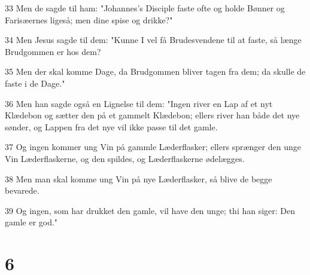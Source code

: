 \par 33 Men de sagde til ham: "Johannes's Disciple faste ofte og holde Bønner og Farisæernes ligeså; men dine spise og drikke?"
\par 34 Men Jesus sagde til dem: "Kunne I vel få Brudesvendene til at faste, så længe Brudgommen er hos dem?
\par 35 Men der skal komme Dage, da Brudgommen bliver tagen fra dem; da skulle de faste i de Dage."
\par 36 Men han sagde også en Lignelse til dem: "Ingen river en Lap af et nyt Klædebon og sætter den på et gammelt Klædebon; ellers river han både det nye sønder, og Lappen fra det nye vil ikke passe til det gamle.
\par 37 Og ingen kommer ung Vin på gammle Læderflasker; ellers sprænger den unge Vin Læderflaskerne, og den spildes, og Læderflaskerne ødelægges.
\par 38 Men man skal komme ung Vin på nye Læderflasker, så blive de begge bevarede.
\par 39 Og ingen, som har drukket den gamle, vil have den unge; thi han siger: Den gamle er god."

\chapter{6}

